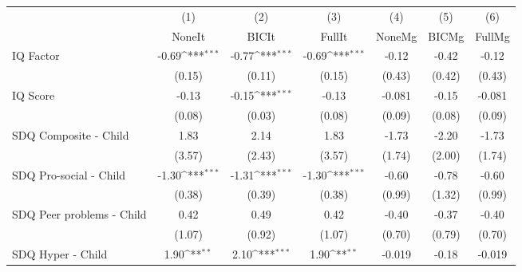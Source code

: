 {
\def\sym#1{\ifmmode^{#1}\else\(^{#1}\)\fi}
\begin{tabular}{l*{6}{c}}
\toprule
            &\multicolumn{1}{c}{(1)}&\multicolumn{1}{c}{(2)}&\multicolumn{1}{c}{(3)}&\multicolumn{1}{c}{(4)}&\multicolumn{1}{c}{(5)}&\multicolumn{1}{c}{(6)}\\
            &\multicolumn{1}{c}{NoneIt}&\multicolumn{1}{c}{BICIt}&\multicolumn{1}{c}{FullIt}&\multicolumn{1}{c}{NoneMg}&\multicolumn{1}{c}{BICMg}&\multicolumn{1}{c}{FullMg}\\
\midrule
IQ Factor   &       -0.69\sym{***}&       -0.77\sym{***}&       -0.69\sym{***}&       -0.12         &       -0.42         &       -0.12         \\
            &      (0.15)         &      (0.11)         &      (0.15)         &      (0.43)         &      (0.42)         &      (0.43)         \\
\addlinespace
IQ Score    &       -0.13         &       -0.15\sym{***}&       -0.13         &      -0.081         &       -0.15         &      -0.081         \\
            &      (0.08)         &      (0.03)         &      (0.08)         &      (0.09)         &      (0.08)         &      (0.09)         \\
\addlinespace
SDQ Composite - Child&        1.83         &        2.14         &        1.83         &       -1.73         &       -2.20         &       -1.73         \\
            &      (3.57)         &      (2.43)         &      (3.57)         &      (1.74)         &      (2.00)         &      (1.74)         \\
\addlinespace
SDQ Pro-social - Child&       -1.30\sym{***}&       -1.31\sym{***}&       -1.30\sym{***}&       -0.60         &       -0.78         &       -0.60         \\
            &      (0.38)         &      (0.39)         &      (0.38)         &      (0.99)         &      (1.32)         &      (0.99)         \\
\addlinespace
SDQ Peer problems - Child&        0.42         &        0.49         &        0.42         &       -0.40         &       -0.37         &       -0.40         \\
            &      (1.07)         &      (0.92)         &      (1.07)         &      (0.70)         &      (0.79)         &      (0.70)         \\
\addlinespace
SDQ Hyper - Child&        1.90\sym{**} &        2.10\sym{***}&        1.90\sym{**} &      -0.019         &       -0.18         &      -0.019         \\

\end{tabular}}
